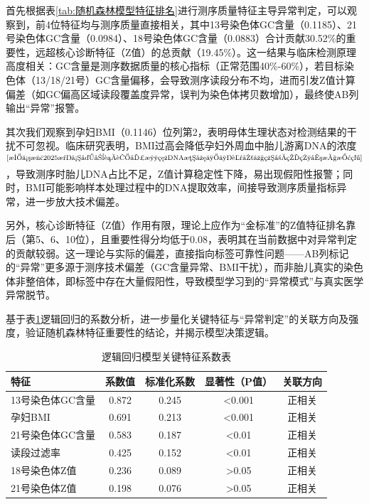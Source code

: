 \documentclass[withoutpreface,bwprint]{cumcmthesis} %
\begin{document}
首先根据表\ref{tab:随机森林模型特征排名}进行测序质量特征主导异常判定，可以观察到，前4位特征均与测序质量直接相关，其中13号染色体GC含量（0.1185）、21号染色体GC含量（0.0984）、18号染色体GC含量（0.0883）合计贡献30.52\%的重要性，远超核心诊断特征（Z值）的总贡献（19.45\%）。这一结果与临床检测原理高度相关：GC含量是测序数据质量的核心指标（正常范围40\%-60\%），若目标染色体（13/18/21号）GC含量偏移，会导致测序读段分布不均，进而引发Z值计算偏差（如GC偏高区域读段覆盖度异常，误判为染色体拷贝数增加），最终使AB列输出“异常”报警。

其次我们观察到孕妇BMI（0.1146）位列第2，表明母体生理状态对检测结果的干扰不可忽视。临床研究表明，BMI过高会降低孕妇外周血中胎儿游离DNA的浓度$^\text{\cite{李佳欣2025母体外周血胎儿游离DNA浓度与不良围产结局的相关性探究}}$，导致测序时胎儿DNA占比不足，Z值计算稳定性下降，易出现假阳性报警；同时，BMI可能影响样本处理过程中的DNA提取效率，间接导致测序质量指标异常，进一步放大技术偏差。

另外，核心诊断特征（Z值）作用有限，理论上应作为“金标准”的Z值特征排名靠后（第5、6、10位），且重要性得分均低于0.08，表明其在当前数据中对异常判定的贡献较弱。这一理论与实际的偏差，直接指向标签可靠性问题——AB列标记的“异常”更多源于测序技术偏差（GC含量异常、BMI干扰），而非胎儿真实的染色体非整倍体，即标签中存在大量假阳性，导致模型学习到的“异常模式”与真实医学异常脱节。

基于表\ref{tab:逻辑回归模型关键特征系数表}逻辑回归的系数分析，进一步量化关键特征与“异常判定”的关联方向及强度，验证随机森林特征重要性的结论，并揭示模型决策逻辑。


\begin{table}[H]
    \centering  %
    \caption{逻辑回归模型关键特征系数表}  %
    \label{tab:逻辑回归模型关键特征系数表}  %
    \begin{threeparttable}
        \begin{tabularx}{0.88\textwidth}{l c c c c}
            \toprule[1.5pt]
            \textbf{特征} & \textbf{系数值} & \textbf{标准化系数} & \textbf{显著性（P值）} & \textbf{关联方向} \\ 
            \midrule[1pt]
            13号染色体GC含量    & 0.872    & 0.245      & <0.001        & 正相关   \\
            孕妇BMI             & 0.691    & 0.213      & <0.001        & 正相关   \\
            21号染色体GC含量    & 0.583    & 0.187      & <0.01         & 正相关   \\
            读段过滤率          & 0.425    & 0.152      & <0.01         & 正相关   \\
            18号染色体Z值       & 0.236    & 0.089      & >0.05         & 正相关   \\
            21号染色体Z值       & 0.198    & 0.076      & >0.05         & 正相关   \\

            \bottomrule[1.5pt]
        \end{tabularx}
    \end{threeparttable}
\end{table}
\end{document}
